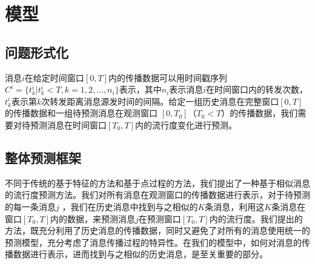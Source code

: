 %

\section{模型}
\subsection{问题形式化}
消息$i$在给定时间窗口$[0,T]$内的传播数据可以用时间戳序列$C^i=\{t_k^i|t_k^i<T,k=1,2,...,n_i\}$表示，其中$n_i$表示消息$i$在时间窗口内的转发次数，$t_k^i$表示第$k$次转发距离消息源发时间的间隔。给定一组历史消息在完整窗口$[0,T]$的传播数据和一组待预测消息在观测窗口 $[0,T_0]$（$T_0<T$）的传播数据，我们需要对待预测消息在时间窗口$[T_0,T]$内的流行度变化进行预测。

\subsection{整体预测框架}
不同于传统的基于特征的方法和基于点过程的方法，我们提出了一种基于相似消息的流行度预测方法。我们对所有消息在观测窗口的传播数据进行表示，对于待预测的每一条消息$j$ ，我们在历史消息中找到与之相似的$K$条消息，利用这$K$条消息在窗口$[T_0,T]$内的数据，来预测消息$j$在预测窗口$[T_0,T]$内的流行度。我们提出的方法，既充分利用了历史消息的传播数据，同时又避免了对所有的消息使用统一的预测模型，充分考虑了消息传播过程的特异性。在我们的模型中，如何对消息的传播数据进行表示，进而找到与之相似的历史消息，是至关重要的部分。

